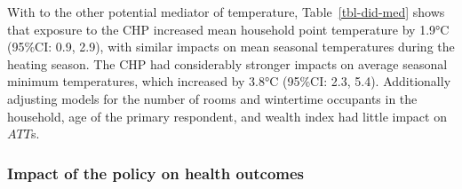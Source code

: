 \documentclass[
  letterpaper,
  DIV=11,
  numbers=noendperiod]{scrartcl}
\begin{document}
With  to the other potential mediator of
temperature, Table~\ref{tbl-did-med} shows that exposure to the CHP
increased mean household point temperature by 1.9°C (95\%CI: 0.9, 2.9),
with similar impacts on mean seasonal temperatures during the heating
season. The CHP had considerably stronger impacts on average seasonal
minimum temperatures, which increased by 3.8°C (95\%CI: 2.3, 5.4).
Additionally adjusting models for the number of rooms and wintertime
occupants in the household, age of the primary respondent, and wealth
index had little impact on \(ATT\)s.

\subsubsection{Impact of the policy on health
outcomes}\label{impact-of-the-policy-on-health-outcomes}
\end{document}
